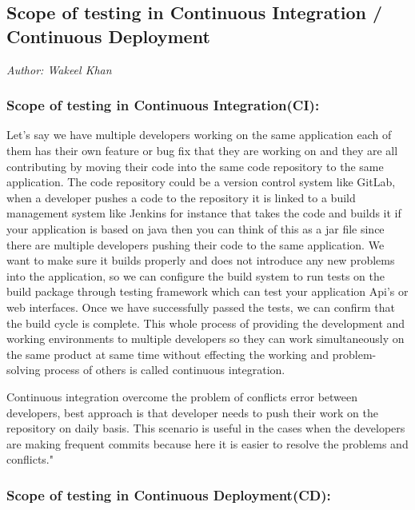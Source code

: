 
\subsection{Scope of testing in Continuous Integration / Continuous Deployment}\label{sec:Scope of Continuous Integration / Continuous Deployment}

\textit{Author: Wakeel Khan}

\subsubsection{Scope of testing in Continuous Integration(CI):}

Let's say we have multiple developers working on the same application each of them
has their own feature or bug fix that they are working on and they are all contributing
by moving their code into the same code repository to the same application. The code
repository could be a version control system like GitLab, when a developer pushes a code
to the repository it is linked to a build management system like Jenkins for instance
that takes the code and builds it if your application is based on java then you can think
of this as a jar file since there are multiple developers pushing their code to the same
application. We want to make sure it builds properly and does not introduce any new
problems into the application, so we can configure the build system to run tests on the
build package through testing framework which can test your application Api's or web
interfaces. Once we have successfully passed the tests, we can confirm that the build cycle
is complete. This whole process of providing the development and working environments
to multiple developers so they can work simultaneously on the same product at same time
without effecting the working and problem-solving process of others is called continuous
integration. \par

Continuous integration overcome the problem of conflicts error between developers, best
approach is that developer needs to push their work on the repository on daily basis. This
scenario is useful in the cases when the developers are making frequent commits because
here it is easier to resolve the problems and conflicts." \cite{larman2004agile}


\subsubsection{Scope of testing in Continuous Deployment(CD):}

